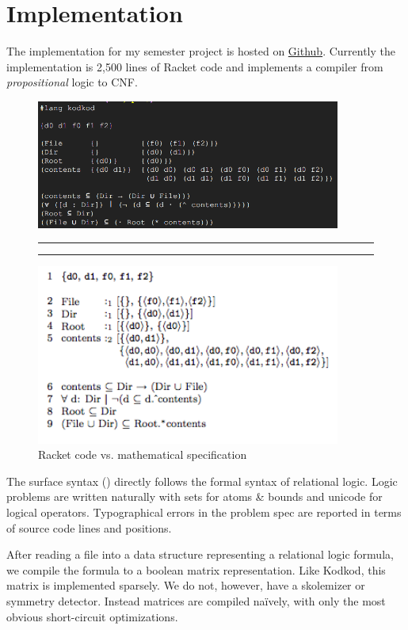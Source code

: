 \section{Implementation}
\label{sec:compile}

The implementation for my semester project is hosted on \href{https://github.com/bennn/rkt-kodkod}{Github}.
Currently the implementation is 2,500 lines of Racket code and implements a compiler from \emph{propositional} logic to CNF.

\begin{figure}[t]
  \label{fig:lang}
\includegraphics[width=10cm]{rkt.png}

  \vspace{0.1cm}
  \hrule\hrule

\includegraphics[width=10cm]{fs.png}
\caption{Racket code vs. mathematical specification}
\end{figure}

The surface syntax () directly follows the formal syntax of relational logic.
Logic problems are written naturally with sets for atoms \& bounds and
 unicode for logical operators.
Typographical errors in the problem spec are reported in terms of source code
 lines and positions.

After reading a file into a data structure representing a relational logic
 formula, we compile the formula to a boolean matrix representation.
Like Kodkod, this matrix is implemented sparsely.
We do not, however, have a skolemizer or symmetry detector.
Instead matrices are compiled na\"ively, with only the most obvious short-circuit
 optimizations.

